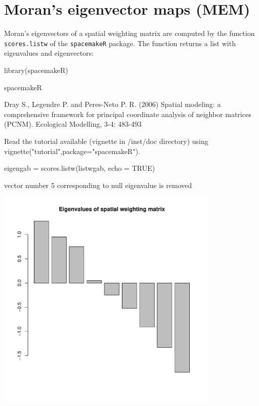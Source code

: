 \documentclass[a4paper]{article}
\begin{document}
\section{Moran's eigenvector maps (MEM)}
Moran's eigenvectors of a spatial weighting matrix are computed by the function \texttt{scores.listw} of the \texttt{spacemakeR} package.
The function returns a list with eigenvalues and eigenvectors:
\begin{Schunk}
\begin{Sinput}
 library(spacemakeR)
\end{Sinput}
\begin{Soutput}
spacemakeR

Dray S., Legendre P. and Peres-Neto P. R. (2006)
Spatial modeling: a comprehensive framework for principal
coordinate analysis of neighbor matrices (PCNM). Ecological Modelling, 3-4: 483-493

Read the tutorial available (vignette in /inst/doc directory) using vignette("tutorial",package="spacemakeR").
\end{Soutput}
\begin{Sinput}
 eigengab = scores.listw(listwgab, echo = TRUE)
\end{Sinput}
\begin{Soutput}
vector number 5 corresponding to null eigenvalue is removed 
\end{Soutput}
\end{Schunk}
\begin{center}
\includegraphics[width=0.8\textwidth,keepaspectratio]{figs/tutorial-ni24}
\end{center}
\end{document}
